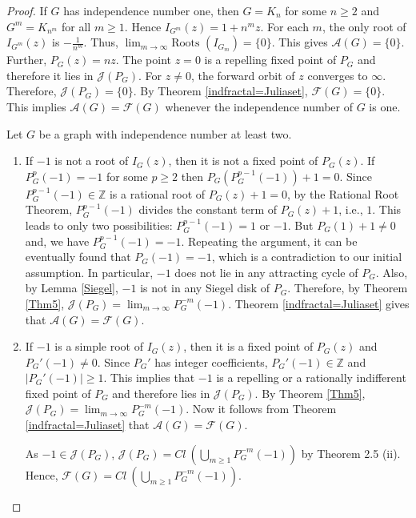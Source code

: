 \documentclass[12pt,a4paper]{article}
\theoremstyle{plain}
\numberwithin{equation}{section}
\begin{document}
    \begin{proof}
        If \(G\) has independence number one, then \(G=K_n\)  for some \(n\geq 2\) and \(G^m = K_{n^m}\) for all \(m\geq 1\). Hence \(I_{G^m}(z) = 1 + n^mz\). For each \(m\), the only root of \(I_{G^m}(z)\) is \(-\frac{1}{n^m}\). Thus, $ \lim_{m \rightarrow \infty} \text{Roots }(I_{G_m}) = \{0\}$. This gives $\mathcal{A}(G) = \{0\}$.
        Further, \(P_G(z) = nz\). The point \(z=0\) is a repelling fixed point of \(P_G\) and therefore it lies in \(\mathcal{J}(P_G)\). For \(z\neq 0\), the forward orbit of \(z\) converges to \(\infty\). Therefore, \(\mathcal{J}(P_G) = \{0\}\). By Theorem \ref{indfractal=Juliaset}, \(\mathcal{F}(G) = \{0\}\). This implies \(\mathcal{A}(G) = \mathcal{F}(G)\) whenever the independence number of $G$ is one.
        \par
        Let \(G\) be a graph with independence number at least two.
        
           \begin{enumerate}
           	\item If \(-1\) is not a root of \(I_G(z)\), then it is not a fixed point of \(P_G(z)\). If  \(P_G^{p}(-1) = -1\) for some \(p\geq 2\) then \(P_G(P_G^{p-1}(-1)) + 1 = 0\). Since \(P_G^{p-1}(-1) \in \mathbb{Z}\) is a rational root of $P_G (z)+1=0$, by the Rational Root Theorem, $P_G^{p-1}(-1)$ divides the constant term of  \(P_G(z)+1 \), i.e., $1$. This leads to only two possibilities: \(P_G^{p-1}(-1) = 1\) or \(-1\). But \(P_G(1)+1 \neq 0\) and, we have  \(P_G^{p-1}(-1) = -1\). Repeating the argument, it can be eventually  found that \(P_G(-1)=-1\),  which is a contradiction to our initial assumption. In particular, \(-1\) does not lie in any attracting cycle of \(P_G\). Also, by Lemma \ref{Siegel}, \(-1\) is not in any Siegel disk of \(P_G\). Therefore, by  Theorem \ref{Thm5}, $\mathcal{J}(P_G) =\lim_{m \to \infty} P_G ^{-m}(-1)$.   Theorem \ref{indfractal=Juliaset} gives that \(\mathcal{A}(G)=\mathcal{F}(G)\).
        

        
            \item  If \(-1\) is a simple root of \(I_G(z)\), then it is a fixed point of \(P_G(z)\) and \(P_G'(-1) \neq 0\). Since \(P_G'\) has integer coefficients, \(P_G'(-1) \in \mathbb{Z}\) and \(|P_G'(-1)| \geq 1\). This implies that \(-1\) is a repelling or a rationally indifferent fixed point of \(P_G\) and therefore lies in \(\mathcal{J}(P_G)\).  By Theorem \ref{Thm5}, $\mathcal{J}(P_G) =\lim_{m \to \infty} P_G ^{-m}(-1)$. Now it follows from  Theorem \ref{indfractal=Juliaset} that   \(\mathcal{A}(G) =\mathcal{F}(G) \).
            \par
            As \(-1 \in \mathcal{J}(P_G)\), $\mathcal{J}(P_G) = Cl~\left(\bigcup_{m\geq 1}P_G^{-m}(-1)\right)$  by Theorem 2.5 (ii). Hence, \(\mathcal{F}(G) = Cl~\left(\bigcup_{m\geq 1}P_G^{-m}(-1)\right).\)
        


\end{enumerate}
\end{proof}
\end{document}
